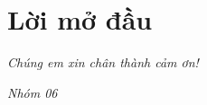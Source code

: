 \section*{Lời mở đầu}
\thispagestyle{empty}
\lipsum[1]

\begin{flushright}
	\textit{Chúng em xin chân thành cảm ơn!}
\end{flushright}
\hspace{13cm}\textit{Nhóm 06}